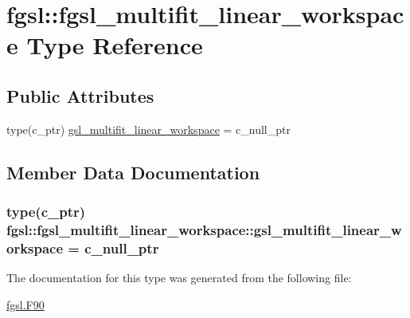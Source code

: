 \hypertarget{structfgsl_1_1fgsl__multifit__linear__workspace}{}\section{fgsl\+:\+:fgsl\+\_\+multifit\+\_\+linear\+\_\+workspace Type Reference}
\label{structfgsl_1_1fgsl__multifit__linear__workspace}
\subsection*{Public Attributes}
\begin{DoxyCompactItemize}
\item 
type(c\+\_\+ptr) \hyperlink{structfgsl_1_1fgsl__multifit__linear__workspace_ae181de375933a138dd41f225d12b2859}{gsl\+\_\+multifit\+\_\+linear\+\_\+workspace} = c\+\_\+null\+\_\+ptr
\end{DoxyCompactItemize}


\subsection{Member Data Documentation}
\hypertarget{structfgsl_1_1fgsl__multifit__linear__workspace_ae181de375933a138dd41f225d12b2859}{}
\subsubsection[{gsl\+\_\+multifit\+\_\+linear\+\_\+workspace}]{\setlength{\rightskip}{0pt plus 5cm}type(c\+\_\+ptr) fgsl\+::fgsl\+\_\+multifit\+\_\+linear\+\_\+workspace\+::gsl\+\_\+multifit\+\_\+linear\+\_\+workspace = c\+\_\+null\+\_\+ptr}\label{structfgsl_1_1fgsl__multifit__linear__workspace_ae181de375933a138dd41f225d12b2859}


The documentation for this type was generated from the following file\+:\begin{DoxyCompactItemize}
\item 
\hyperlink{fgsl_8F90}{fgsl.\+F90}\end{DoxyCompactItemize}
